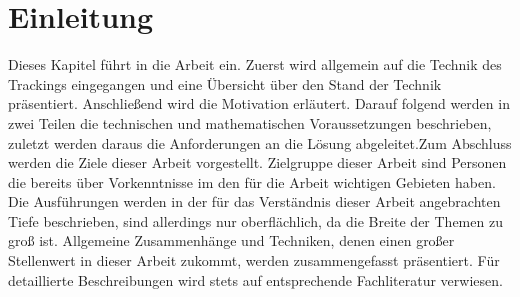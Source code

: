 \documentclass[a4paper,12pt, twoside, openright]{scrbook}
\begin{document}
\frontmatter 









\tableofcontents 
%
\listoffigures
%
\listoftables
%
\lstlistoflistings
%

%


\mainmatter 
\chapter{Einleitung}
Dieses Kapitel führt in die Arbeit ein. Zuerst wird allgemein auf die Technik des Trackings eingegangen und eine Übersicht über den Stand der Technik präsentiert. Anschließend wird die Motivation erläutert. Darauf folgend werden in zwei Teilen die technischen und mathematischen Voraussetzungen beschrieben, zuletzt werden daraus die Anforderungen an die Lösung abgeleitet.Zum Abschluss werden die Ziele dieser Arbeit vorgestellt.
Zielgruppe dieser Arbeit sind Personen die bereits über Vorkenntnisse im den für die Arbeit wichtigen Gebieten haben. Die Ausführungen werden in der für das Verständnis dieser Arbeit angebrachten Tiefe beschrieben, sind allerdings nur oberflächlich, da die Breite der Themen zu groß ist. Allgemeine Zusammenhänge und Techniken, denen einen großer Stellenwert in dieser Arbeit zukommt, werden zusammengefasst präsentiert. Für detaillierte Beschreibungen wird stets auf entsprechende Fachliteratur verwiesen. 
%

%
\end{document}
